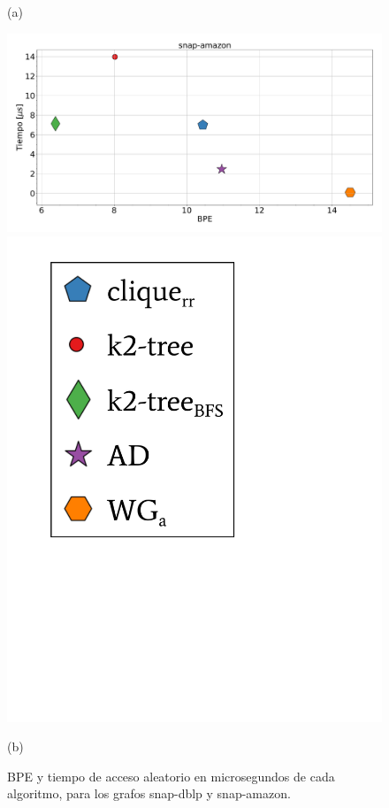 \begin{figure}
\begin{minipage}{1\textwidth}
    			(a)		
    	\end{minipage}
    	
       	\begin{minipage}{1\textwidth}
    			\centering
    			\begin{minipage}{0.8\textwidth}
    				\centering
    				\includegraphics[width=1\linewidth]{img/bpeTimes/aleatorio/snap-amazon.pdf}
    			\end{minipage}
    			\begin{minipage}{0.15\textwidth}
    				\centering
    				\includegraphics[scale=.24, clip, trim=70 300 230 30]{img/bpeTimes/labelAle.pdf}
    			\end{minipage}
    			
    			(b)		
    	\end{minipage}
    	
    \caption{BPE y tiempo de acceso aleatorio en microsegundos de cada algoritmo, para los grafos snap-dblp y snap-amazon.}
    \label{fig:bpetAle3}
\end{figure}
